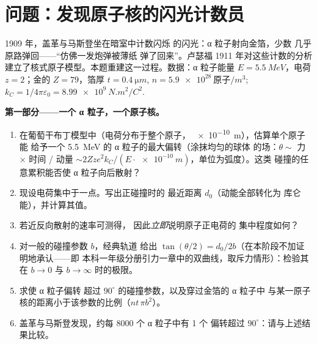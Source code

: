 \section{问题：发现原子核的闪光计数员}

\begin{problem}\label{pb:b3:scattering-theory:1}
1909 年，盖革与马斯登坐在暗室中计数闪烁
的闪光：α 粒子射向金箔，少数
几乎原路弹回——“仿佛一发炮弹被薄纸
弹了回来”。卢瑟福 1911 年对这些计数的分析
建立了核式原子模型。本题重建这一过程。数据：α 粒子能量 $E =
\qty{5.5}{MeV}$，电荷 $z = 2$；金的 $Z = 79$，箔厚 $t
= \qty{0.4}{\micro m}$, $n = \qty{5.9e28}{\text{原子}/m^3}$; $k_C =
1/4\pi\varepsilon_0 = \qty{8.99e9}{N.m^2/C^2}$.

\medskip\noindent\textbf{第一部分——一个 α 粒子，一个原子核。}
\begin{enumerate}
  \item 在葡萄干布丁模型中（电荷分布于整个原子，
        \qty{e-10}{m}），估算单个原子能
        给予一个 \qty{5.5}{MeV} 的 α 粒子的最大偏转（涂抹均匀的球体
        的场：$\theta \sim$ 力 $\times$ 时间 / 动量
        $\sim 2Zze^2k_C/(E\cdot\qty{e-10}{m})$，单位为弧度）。这类
        碰撞的任意累积能否使 α 粒子向后散射？
  \item 现设电荷集中于一点。写出正碰撞时的
        最近距离 $d_0$（动能全部转化为
        库仑能），并计算其值。
  \item 若近反向散射的速率可测得，
        因此\emph{立即}说明原子正电荷的
        集中程度如何？
  \item 对一般的碰撞参数 $b$，经典轨道
        给出 $\tan(\theta/2) = d_0/2b$（在本阶段不加证明地承认——即
        本科一年级分册引力一章中的双曲线，取斥力情形）：检验其在
        $b \to 0$ 与 $b \to
        \infty$ 时的极限。
  \item 求使 α 粒子偏转
        超过 $90^\circ$ 的碰撞参数，以及穿过金箔的 α 粒子中
        与某一原子核的距离小于该参数的比例（$n t\,\pi
        b^2$）。
  \item 盖革与马斯登发现，约每 8000 个 α 粒子中有 1 个
        偏转超过 $90^\circ$：请与上述结果比较。
\end{enumerate}


\end{problem}
